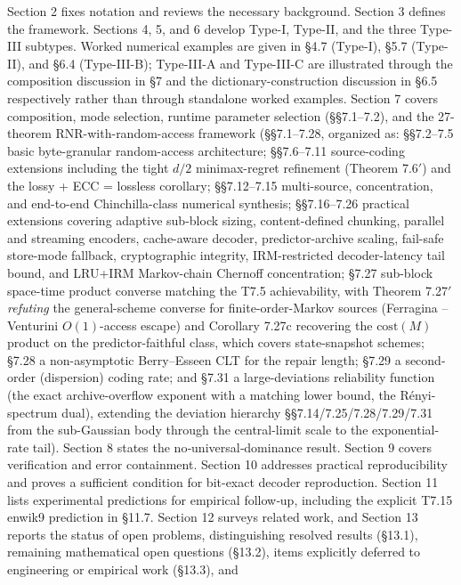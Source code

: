 \documentclass[
]{article}
\begin{document}
Section 2 fixes notation and reviews the necessary background. Section 3
defines the framework. Sections 4, 5, and 6 develop Type-I, Type-II,
and the three Type-III subtypes. Worked numerical examples are given
in §4.7 (Type-I), §5.7 (Type-II), and §6.4 (Type-III-B); Type-III-A
and Type-III-C are illustrated through the composition discussion in
§7 and the dictionary-construction discussion in §6.5 respectively
rather than through standalone worked examples. Section 7 covers
composition, mode selection, runtime parameter selection (§§7.1--7.2),
and the 27-theorem RNR-with-random-access framework
(§§7.1--7.28, organized as: §§7.2--7.5 basic byte-granular
random-access architecture; §§7.6--7.11 source-coding extensions
including the tight $d/2$ minimax-regret refinement (Theorem 7.6$'$)
and the lossy + ECC = lossless corollary; §§7.12--7.15
multi-source, concentration, and end-to-end Chinchilla-class
numerical synthesis; §§7.16--7.26 practical extensions covering
adaptive sub-block sizing, content-defined chunking, parallel and
streaming encoders, cache-aware decoder, predictor-archive scaling,
fail-safe store-mode fallback, cryptographic integrity, IRM-restricted
decoder-latency tail bound, and LRU+IRM Markov-chain Chernoff
concentration; §7.27 sub-block space-time product converse matching
the T7.5 achievability, with Theorem 7.27$'$ \emph{refuting} the
general-scheme converse for finite-order-Markov sources (Ferragina
--Venturini $O(1)$-access escape) and Corollary 7.27c recovering the
$\mathrm{cost}(M)$ product on the predictor-faithful class, which
covers state-snapshot schemes; §7.28 a non-asymptotic
Berry--Esseen CLT for the repair length; §7.29 a second-order
(dispersion) coding rate; and §7.31 a large-deviations reliability
function (the exact archive-overflow exponent with a matching lower
bound, the R\'enyi-spectrum dual), extending the deviation hierarchy
§§7.14/7.25/7.28/7.29/7.31 from the sub-Gaussian body through the
central-limit scale to the exponential-rate tail). Section 8 states the
no‑universal‑dominance result. Section 9 covers verification and error
containment. Section 10 addresses practical reproducibility and proves a
sufficient condition for bit-exact decoder reproduction. Section 11
lists experimental predictions for empirical follow‑up, including the
explicit T7.15 enwik9 prediction in §11.7. Section 12 surveys related
work, and Section 13 reports the status of open problems, distinguishing
resolved results (§13.1), remaining mathematical open questions (§13.2),
items explicitly deferred to engineering or empirical work (§13.3), and
\end{document}
